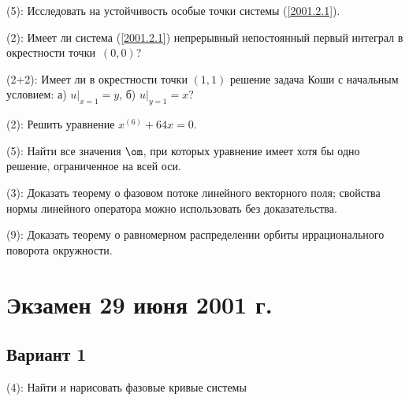 \documentclass[a4paper]{article}
\newcommand{\skill}[1]{\textsf{(#1):}}
\begin{document}
\begin{problem}
\skill{5}
Исследовать на устойчивость особые точки системы (\ref{2001.2.1}).
\end{problem}

\begin{problem}
\skill{2}
Имеет ли система (\ref{2001.2.1}) непрерывный непостоянный первый интеграл в окрестности
точки~$(0,0)$?
\end{problem}

\begin{problem}
\skill{2+2}
Имеет ли в окрестности точки $(1,1)$ решение задача Коши
с начальным условием: а) $u\rvert_{x=1}=y$, б) $u\rvert_{y=1} = x$?
\end{problem}

\begin{problem}
\skill{2}
Решить уравнение $x^{(6)} + 64 x = 0$.
\end{problem}

\begin{problem}
\skill{5}
Найти все значения $\om$, при которых уравнение
имеет хотя бы одно решение, ограниченное на всей оси.
\end{problem}

\begin{problem}
\skill{3}
Доказать теорему о фазовом потоке линейного векторного поля; свойства нормы линейного оператора
можно использовать без доказательства.
\end{problem}

\begin{problem}
\skill{9}
Доказать теорему о равномерном распределении орбиты иррационального поворота окружности.
\end{problem}

\section{Экзамен 29 июня 2001 г.}

\subsection{Вариант 1}

\begin{problem}
\skill{4}
Найти и нарисовать фазовые кривые системы
\end{problem}
\end{document}
